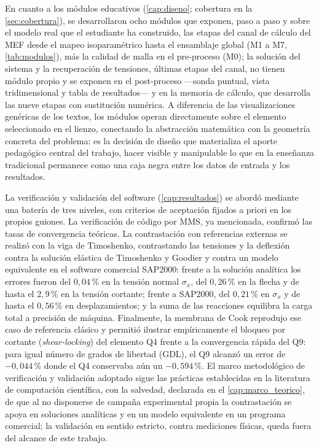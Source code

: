 En cuanto a los módulos educativos (\autoref{cap:diseno}; cobertura en la \autoref{sec:cobertura}), se desarrollaron ocho módulos que exponen, paso a paso y sobre el modelo real que el estudiante ha construido, las etapas del canal de cálculo del MEF desde el mapeo isoparamétrico hasta el ensamblaje global (M1 a M7, \autoref{tab:modulos}), más la calidad de malla en el pre-proceso (M0); la solución del sistema y la recuperación de tensiones, últimas etapas del canal, no tienen módulo propio y se exponen en el post-proceso —sonda puntual, vista tridimensional y tabla de resultados— y en la memoria de cálculo, que desarrolla las nueve etapas con sustitución numérica. A diferencia de las visualizaciones genéricas de los textos, los módulos operan directamente sobre el elemento seleccionado en el lienzo, conectando la abstracción matemática con la geometría concreta del problema: es la decisión de diseño que materializa el aporte pedagógico central del trabajo, hacer visible y manipulable lo que en la enseñanza tradicional permanece como una caja negra entre los datos de entrada y los resultados.

La verificación y validación del software (\autoref{cap:resultados}) se abordó mediante una batería de tres niveles, con criterios de aceptación fijados a priori en los propios guiones. La verificación de código por MMS, ya mencionada, confirmó las tasas de convergencia teóricas. La contrastación con referencias externas se realizó con la viga de Timoshenko, contrastando las tensiones y la deflexión contra la solución elástica de Timoshenko y Goodier y contra un modelo equivalente en el software comercial SAP2000: frente a la solución analítica los errores fueron del $0{,}04\,\%$ en la tensión normal $\sigma_x$, del $0{,}26\,\%$ en la flecha y de hasta el $2{,}9\,\%$ en la tensión cortante; frente a SAP2000, del $0{,}21\,\%$ en $\sigma_x$ y de hasta el $0{,}56\,\%$ en desplazamientos; y la suma de las reacciones equilibra la carga total a precisión de máquina. Finalmente, la membrana de Cook reprodujo ese caso de referencia clásico y permitió ilustrar empíricamente el bloqueo por cortante (\emph{shear-locking}) del elemento Q4 frente a la convergencia rápida del Q9: para igual número de grados de libertad (GDL), el Q9 alcanzó un error de $-0{,}044\,\%$ donde el Q4 conservaba aún un $-0{,}594\,\%$. El marco metodológico de verificación y validación adoptado sigue las prácticas establecidas en la literatura de computación científica, con la salvedad, declarada en el \autoref{cap:marco_teorico}, de que al no disponerse de campaña experimental propia la contrastación se apoya en soluciones analíticas y en un modelo equivalente en un programa comercial; la validación en sentido estricto, contra mediciones físicas, queda fuera del alcance de este trabajo.

